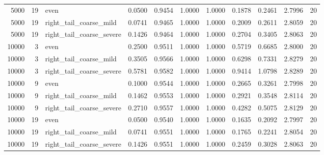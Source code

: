 \begin{table}[!h]
{\begin{tabular}[t]{rrlrrrrrrrr}
5000 & 19 & even & 0.0500 & 0.9454 & 1.0000 & 1.0000 & 0.1878 & 0.2461 & 2.7996 & 20\\
5000 & 19 & right\_tail\_coarse\_mild & 0.0741 & 0.9465 & 1.0000 & 1.0000 & 0.2009 & 0.2611 & 2.8059 & 20\\
5000 & 19 & right\_tail\_coarse\_severe & 0.1426 & 0.9464 & 1.0000 & 1.0000 & 0.2704 & 0.3405 & 2.8063 & 20\\
10000 & 3 & even & 0.2500 & 0.9511 & 1.0000 & 1.0000 & 0.5719 & 0.6685 & 2.8000 & 20\\
10000 & 3 & right\_tail\_coarse\_mild & 0.3505 & 0.9566 & 1.0000 & 1.0000 & 0.6298 & 0.7331 & 2.8279 & 20\\
10000 & 3 & right\_tail\_coarse\_severe & 0.5781 & 0.9582 & 1.0000 & 1.0000 & 0.9414 & 1.0798 & 2.8289 & 20\\
10000 & 9 & even & 0.1000 & 0.9544 & 1.0000 & 1.0000 & 0.2665 & 0.3261 & 2.7998 & 20\\
10000 & 9 & right\_tail\_coarse\_mild & 0.1462 & 0.9553 & 1.0000 & 1.0000 & 0.2921 & 0.3548 & 2.8114 & 20\\
10000 & 9 & right\_tail\_coarse\_severe & 0.2710 & 0.9557 & 1.0000 & 1.0000 & 0.4282 & 0.5075 & 2.8129 & 20\\
10000 & 19 & even & 0.0500 & 0.9540 & 1.0000 & 1.0000 & 0.1635 & 0.2092 & 2.7997 & 20\\
10000 & 19 & right\_tail\_coarse\_mild & 0.0741 & 0.9551 & 1.0000 & 1.0000 & 0.1765 & 0.2241 & 2.8054 & 20\\
10000 & 19 & right\_tail\_coarse\_severe & 0.1426 & 0.9551 & 1.0000 & 1.0000 & 0.2459 & 0.3028 & 2.8063 & 20\\
\bottomrule
\end{tabular}}
\end{table}